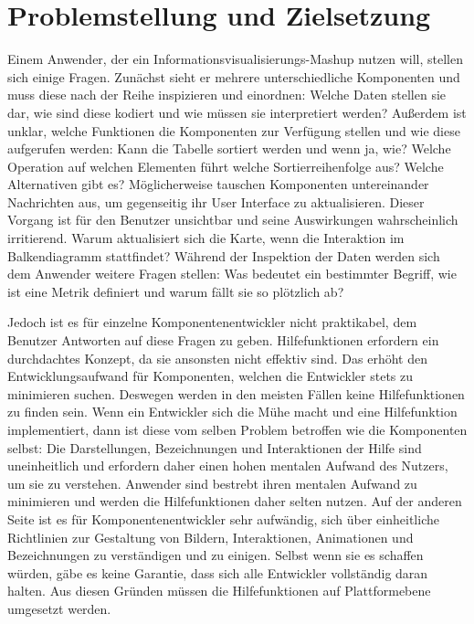 \documentclass[
	headsepline,
	footsepline,
	fontsize=12pt,
	bibliography=totoc
]{scrbook}
\begin{document}
\section{Problemstellung und Zielsetzung}
\label{section:einleitung:problemstellung}


Einem Anwender, der ein Informationsvisualisierungs-Mashup nutzen will, stellen sich einige Fragen. Zunächst sieht er mehrere unterschiedliche Komponenten und muss diese nach der Reihe inspizieren und einordnen: Welche Daten stellen sie dar, wie sind diese kodiert und wie müssen sie interpretiert werden? Außerdem ist unklar, welche Funktionen die Komponenten zur Verfügung stellen und wie diese aufgerufen werden: Kann die Tabelle sortiert werden und wenn ja, wie? Welche Operation auf welchen Elementen führt welche Sortierreihenfolge aus? Welche Alternativen gibt es? Möglicherweise tauschen Komponenten untereinander Nachrichten aus, um gegenseitig ihr User Interface zu aktualisieren. Dieser Vorgang ist für den Benutzer unsichtbar und seine Auswirkungen wahrscheinlich irritierend. Warum aktualisiert sich die Karte, wenn die Interaktion im Balkendiagramm stattfindet? Während der Inspektion der Daten werden sich dem Anwender weitere Fragen stellen: Was bedeutet ein bestimmter Begriff, wie ist eine Metrik definiert und warum fällt sie so plötzlich ab?


Jedoch ist es für einzelne Komponentenentwickler nicht praktikabel, dem Benutzer Antworten auf diese Fragen zu geben. Hilfefunktionen erfordern ein durchdachtes Konzept, da sie ansonsten nicht effektiv sind. Das erhöht den Entwicklungsaufwand für Komponenten, welchen die Entwickler stets zu minimieren suchen. Deswegen werden in den meisten Fällen keine Hilfefunktionen zu finden sein. Wenn ein Entwickler sich die Mühe macht und eine Hilfefunktion implementiert, dann ist diese vom selben Problem betroffen wie die Komponenten selbst: Die Darstellungen, Bezeichnungen und Interaktionen der Hilfe sind uneinheitlich und erfordern daher einen hohen mentalen Aufwand des Nutzers, um sie zu verstehen. Anwender sind bestrebt ihren mentalen Aufwand zu minimieren und werden die Hilfefunktionen daher selten nutzen. Auf der anderen Seite ist es für Komponentenentwickler sehr aufwändig, sich über einheitliche Richtlinien zur Gestaltung von Bildern, Interaktionen, Animationen und Bezeichnungen zu verständigen und zu einigen. Selbst wenn sie es schaffen würden, gäbe es keine Garantie, dass sich alle Entwickler vollständig daran halten. Aus diesen Gründen müssen die Hilfefunktionen auf Plattformebene umgesetzt werden.
\end{document}
